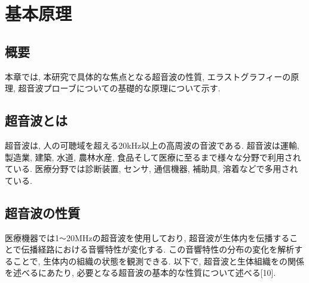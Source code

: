 \chapter{基本原理\label{genri}}
\newpage
\section{概要}
本章では, 本研究で具体的な焦点となる超音波の性質, エラストグラフィーの原理, 超音波プローブについての基礎的な原理について示す.

\section{超音波とは}
超音波は, 人の可聴域を超える20kHz以上の高周波の音波である. 超音波は運輸, 製造業, 建築, 水道, 農林水産, 食品そして医療に至るまで様々な分野で利用されている. 医療分野では診断装置, センサ, 通信機器, 補助具, 溶着などで多用されている. 

\section{超音波の性質}
医療機器では1\verb|〜|20MHzの超音波を使用しており, 超音波が生体内を伝播することで伝播経路における音響特性が変化する. この音響特性の分布の変化を解析することで, 生体内の組織の状態を観測できる. 以下で, 超音波と生体組織をの関係を述べるにあたり, 必要となる超音波の基本的な性質について述べる[10].
